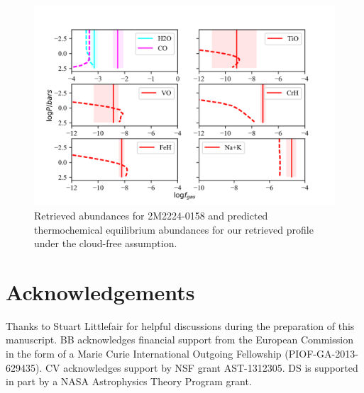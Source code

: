 \documentclass[useAMS,usenatbib]{mn2e}
\begin{document}
\begin{figure}
\hspace{-0.8cm}
\includegraphics[width=350pt]{2M2224_abundances_NC_UCL.png}
\caption{Retrieved abundances for 2M2224-0158 and predicted thermochemical equilibrium abundances for our retrieved profile under the cloud-free assumption. 
\label{fig:2m2224abund_nc}}
\end{figure}


\section*{Acknowledgements}
Thanks to Stuart Littlefair for helpful discussions during the preparation of this manuscript. BB acknowledges financial support from the European Commission in the form of a Marie Curie International Outgoing Fellowship (PIOF-GA-2013- 629435). CV acknowledges support by NSF grant AST-1312305. DS is supported in part by a NASA Astrophysics Theory Program grant.
 


\end{document}
